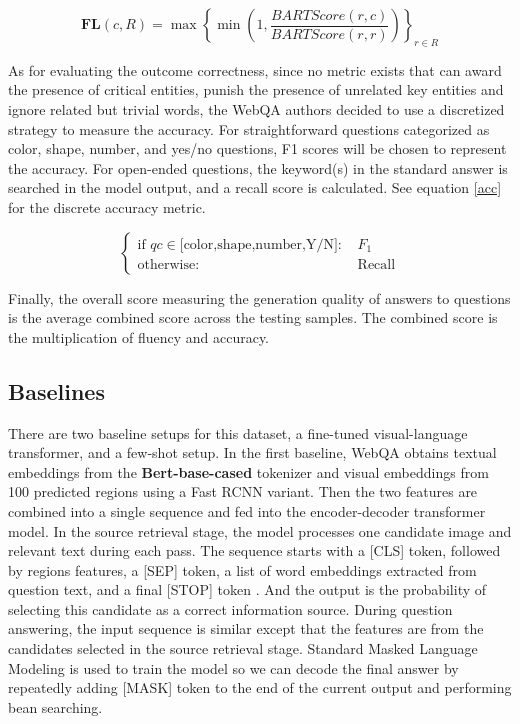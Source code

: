 \documentclass[nohyperref]{article}
\theoremstyle{plain}
\theoremstyle{definition}
\theoremstyle{remark}
\begin{document}
    \begin{equation}
        \label{fluency}
        \textbf{FL}(c,R)=\max\left\{\min\left(1,\frac{BARTScore(r,c)}{BARTScore(r,r)}\right)\right\}_{r\in R}
    \end{equation}

    As for evaluating the outcome correctness, since no metric exists that can award the presence of critical entities, punish the presence of unrelated key entities and ignore related but trivial words, the WebQA authors decided to use a discretized strategy to measure the accuracy.
    For straightforward questions categorized as color, shape, number, and yes/no questions, F1 scores will be chosen to represent the accuracy.
    For open-ended questions, the keyword(s) in the standard answer is searched in the model output, and a recall score is calculated. See equation \ref{acc} for the discrete accuracy metric.

    \begin{equation}
        \label{acc}
        \begin{cases}
            \text{if }qc\in\text{[color,shape,number,Y/N]: } & F_1\\
            \text{otherwise: } & \text{Recall}
        \end{cases}
    \end{equation}

    Finally, the overall score measuring the generation quality of answers to questions is the average combined score across the testing samples.
    The combined score is the multiplication of fluency and accuracy.

    \subsection{Baselines}

    There are two baseline setups for this dataset, a fine-tuned visual-language transformer, and a few-shot setup. In the first baseline, WebQA obtains textual embeddings from the \textbf{Bert-base-cased} \cite{bert} tokenizer and visual embeddings from 100 predicted regions using a Fast RCNN variant.
    Then the two features are combined into a single sequence and fed into the encoder-decoder transformer model.
    In the source retrieval stage, the model processes one candidate image and relevant text during each pass.
    The sequence starts with a [CLS] token, followed by regions features, a [SEP] token, a list of word embeddings extracted from question text, and a final [STOP] token \cite{vlp}. And the output is the probability of selecting this candidate as a correct information source.
    During question answering, the input sequence is similar except that the features are from the candidates selected in the source retrieval stage. Standard Masked Language Modeling \cite{bert} is used to train the model so we can decode the final answer by repeatedly adding [MASK] token to the end of the current output and performing bean searching.
\end{document}
